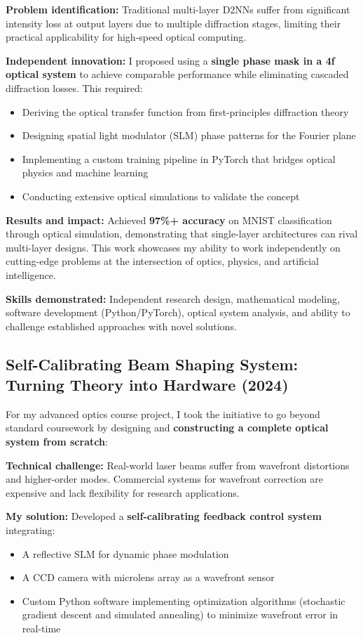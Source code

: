 \documentclass[11pt,a4paper]{article}
\begin{document}
\textbf{Problem identification:} Traditional multi-layer D2NNs suffer from significant intensity loss at output layers due to multiple diffraction stages, limiting their practical applicability for high-speed optical computing.

\textbf{Independent innovation:} I proposed using a \textbf{single phase mask in a 4f optical system} to achieve comparable performance while eliminating cascaded diffraction losses. This required:
\begin{itemize}
    \item Deriving the optical transfer function from first-principles diffraction theory
    \item Designing spatial light modulator (SLM) phase patterns for the Fourier plane
    \item Implementing a custom training pipeline in PyTorch that bridges optical physics and machine learning
    \item Conducting extensive optical simulations to validate the concept
\end{itemize}

\textbf{Results and impact:} Achieved \textbf{97\%+ accuracy} on MNIST classification through optical simulation, demonstrating that single-layer architectures can rival multi-layer designs. This work showcases my ability to work independently on cutting-edge problems at the intersection of optics, physics, and artificial intelligence.

\textbf{Skills demonstrated:} Independent research design, mathematical modeling, software development (Python/PyTorch), optical system analysis, and ability to challenge established approaches with novel solutions.

\subsection{Self-Calibrating Beam Shaping System: Turning Theory into Hardware (2024)}

For my advanced optics course project, I took the initiative to go beyond standard coursework by designing and \textbf{constructing a complete optical system from scratch}:

\textbf{Technical challenge:} Real-world laser beams suffer from wavefront distortions and higher-order modes. Commercial systems for wavefront correction are expensive and lack flexibility for research applications.

\textbf{My solution:} Developed a \textbf{self-calibrating feedback control system} integrating:
\begin{itemize}
    \item A reflective SLM for dynamic phase modulation
    \item A CCD camera with microlens array as a wavefront sensor
    \item Custom Python software implementing optimization algorithms (stochastic gradient descent and simulated annealing) to minimize wavefront error in real-time
\end{itemize}
\end{document}
